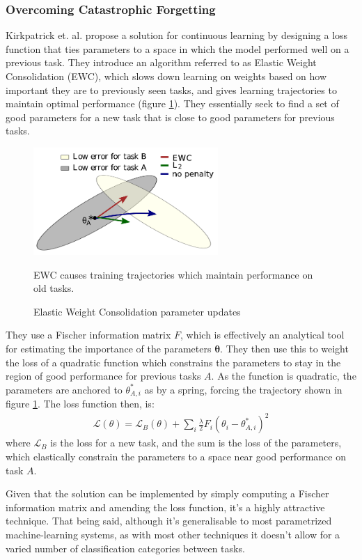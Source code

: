 \documentclass{report}
\begin{document}
	\subsubsection{Overcoming Catastrophic Forgetting}
	Kirkpatrick et. al. \parencite{ewc} propose a solution for continuous learning by designing a loss function that ties parameters to a space in which the model performed well on a previous task. They introduce an algorithm referred to as Elastic Weight Consolidation (EWC), which slows down learning on weights based on how important they are to previously seen tasks, and gives learning trajectories to maintain optimal performance (figure \ref{fig:ewc:1}). They essentially seek to find a set of good parameters for a new task that is close to good parameters for previous tasks. \par
	\begin{figure}[h]
		\centering
		\includegraphics[width=7cm]{ewc}
		\caption{Elastic Weight Consolidation parameter updates}
		EWC causes training trajectories which maintain performance on old tasks.
		\label{fig:ewc:1}
	\end{figure}
	They use a Fischer information matrix $F$, which is effectively an analytical tool for estimating the importance of the parameters $\bm{\theta}$. They then use this to weight the loss of a quadratic function which constrains the parameters to stay in the region of good performance for previous tasks $A$. As the function is quadratic, the parameters are anchored to $\theta_{A,i}^*$ as by a spring, forcing the trajectory shown in figure \ref{fig:ewc:1}. The loss function then, is:
	\begin{align}
   	\mathcal{L}(\theta) = \mathcal{L}_B(\theta) + \sum_{i} \frac{\lambda}{2} F_i (\theta_i - \theta_{A,i}^*)^2	
	\end{align}
	where $\mathcal{L}_B$ is the loss for a new task, and the sum is the loss of the parameters, which elastically constrain the parameters to a space near good performance on task $A$. \par
	Given that the solution can be implemented by simply computing a Fischer information matrix and amending the loss function, it's a highly attractive technique. That being said, although it's generalisable to most parametrized machine-learning systems, as with most other techniques it doesn't allow for a varied number of classification categories between tasks. 
	
\end{document}
